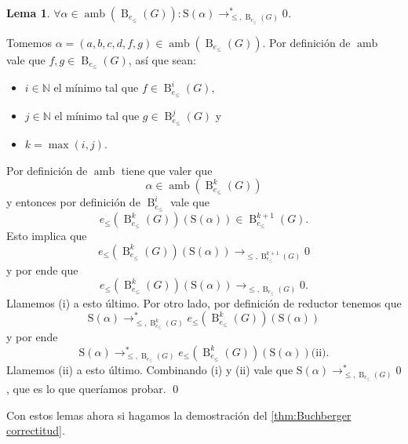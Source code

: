 \documentclass[12pt]{report}
\theoremstyle{customstyle}
\newtheorem{lemma}[theorem]{Lema}
\renewenvironment{proof}[1][\proofname]{{\noindent \bfseries #1: }}{\qed} %
\theoremstyle{factstyle}
\DeclareMathOperator{\amb}{amb}
\renewcommand{\S}{\text{S}}
\DeclareMathOperator{\B}{B}
\begin{document}
\begin{lemma}\label{lemma:Buchberger correctitud:6}
  $∀α ∈ \amb(\B_{e_≤}(G)) : \S(α) →^*_{≤, \B_{e_≤}(G)} 0$.
\end{lemma}
\begin{proof}
  Tomemos $α = (a, b, c, d, f, g) ∈ \amb(\B_{e_≤}(G))$. Por definición de $\amb$ vale que $f, g ∈ \B_{e_≤}(G)$, así que sean:
  \begin{itemize}
    \item $i ∈ ℕ$ el mínimo tal que $f ∈ \B_{e_≤}^i(G)$,
    \item $j ∈ ℕ$ el mínimo tal que $g ∈ \B_{e_≤}^j(G)$ y
    \item $k = \max(i, j)$.
  \end{itemize}

  \noindent Por definición de $\amb$ tiene que valer que
  \[ α ∈ \amb(\B_{e_≤}^k(G)) \]
  y entonces por definición de $\B_{e_≤}^i$ vale que
  \[ e_≤(\B_{e_≤}^k(G))(\S(α)) ∈ \B_{e_≤}^{k + 1}(G) \text{.} \]
  Esto implica que
  \[ e_≤(\B_{e_≤}^k(G))(\S(α)) →_{≤, \B_{e_≤}^{k + 1}(G)} 0\]
  y por ende que
  \[ e_≤(\B_{e_≤}^k(G))(\S(α)) →_{≤, \B_{e_≤}(G)} 0 \text{.} \]
  Llamemos (i) a esto último. Por otro lado, por definición de reductor tenemos que
  \[ \S(α) →^*_{≤, \B_{e_≤}^k(G)} e_≤(\B_{e_≤}^k(G))(\S(α)) \]
  y por ende
  \[ \S(α) →^*_{≤, \B_{e_≤}(G)} e_≤(\B_{e_≤}^k(G))(\S(α)) \text{(ii).} \]
  Llamemos (ii) a esto último. Combinando (i) y (ii) vale que $\S(α) →^*_{≤, \B_{e_≤}(G)} 0$, que es lo que queríamos probar.
\end{proof}

Con estos lemas ahora si hagamos la demostración del \cref{thm:Buchberger correctitud}.
\end{document}
